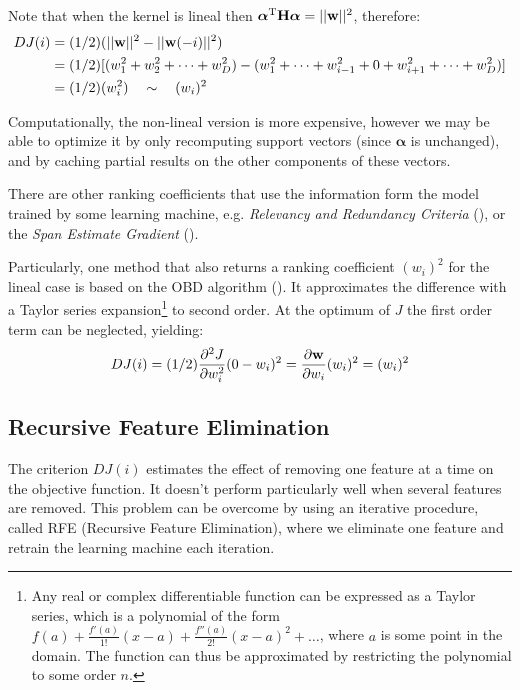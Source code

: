 Note that when the kernel is lineal then $\boldsymbol{\alpha}^{\text{T}} \mathbf{H} \boldsymbol{\alpha} = ||\mathbf{w}||^2$, therefore:
\begin{align*}
    DJ(i) &= (1/2)(||\mathbf{w}||^2 - ||\mathbf{w}(-i)||^2) \\
          &= (1/2)[(w_1^2 + w_2^2 + \dots + w_D^2) - (w_1^2 + \dots + w_{i-1}^2 + 0 + w_{i+1}^2 + \dots + w_D^2)] \\
          &= (1/2)(w_i^2) \quad \sim \quad (w_i)^2
\end{align*} 

Computationally, the non-lineal version is more expensive, however we may be able to optimize it by only recomputing support vectors (since $\boldsymbol{\alpha}$ is unchanged), and by caching partial results on the other components of these vectors.

\begin{sloppypar}
There are other ranking coefficients that use the information form the model trained by some learning machine, e.g. \emph{Relevancy and Redundancy Criteria} (\cite{mundra_svm-rfe_2007}), or the \emph{Span Estimate Gradient} (\cite{rakotomamonjy_variable_2003}).
\end{sloppypar}

Particularly, one method that also returns a ranking coefficient $(w_i)^2$ for the lineal case is based on the OBD algorithm (\cite{guyon_gene_2002}). It approximates the dif\-fer\-ence with a Taylor series expansion\footnote{Any real or complex differentiable function can be expressed as a Taylor series, which is a polynomial of the form $f(a) + \frac{f'(a)}{1!}(x - a) + \frac{f''(a)}{2!}(x - a)^2 + \dots$, where $a$ is some point in the domain. The function can thus be approximated by restricting the polynomial to some order $n$.} to second order. At the optimum of $J$ the first order term can be neglected, yielding:
\begin{align*}
    DJ(i) = (1/2) \frac{\partial^2 J}{\partial w_i^2} (0 - w_i)^2 = \frac{\partial \mathbf{w}}{\partial w_i} (w_i)^2 = (w_i)^2
\end{align*}

\subsection{Recursive Feature Elimination}

The criterion $DJ(i)$ estimates the effect of removing one feature at a time on the objective function. It doesn't perform particularly well when several features are removed. This problem can be overcome by using an iterative procedure, called RFE (Recursive Feature Elimination), where we eliminate one feature and retrain the learning machine each iteration.


